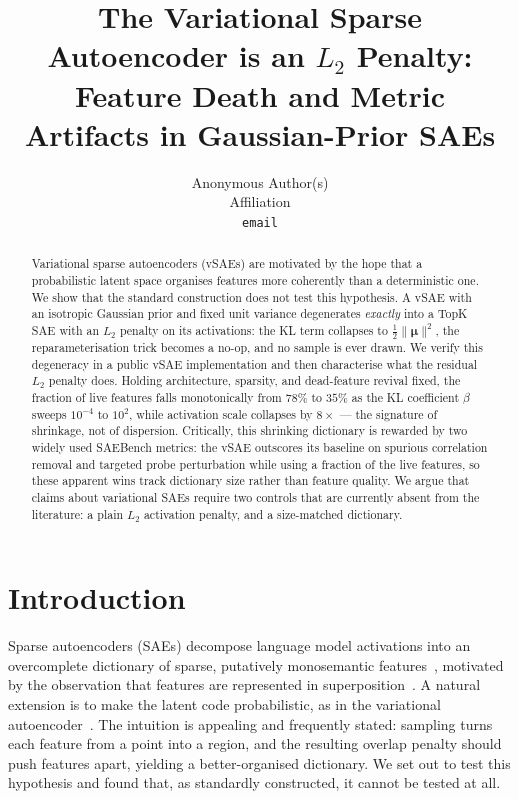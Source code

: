 \documentclass{article}
\title{The Variational Sparse Autoencoder is an $L_2$ Penalty:\\
Feature Death and Metric Artifacts in Gaussian-Prior SAEs}
\author{Anonymous Author(s)\\Affiliation\\\texttt{email}}
\begin{document}
\maketitle

\begin{abstract}
Variational sparse autoencoders (vSAEs) are motivated by the hope that a
probabilistic latent space organises features more coherently than a
deterministic one. We show that the standard construction does not test this
hypothesis. A vSAE with an isotropic Gaussian prior and fixed unit variance
degenerates \emph{exactly} into a TopK SAE with an $L_2$ penalty on its
activations: the KL term collapses to $\tfrac{1}{2}\|\boldsymbol{\mu}\|^2$, the
reparameterisation trick becomes a no-op, and no sample is ever drawn. We verify
this degeneracy in a public vSAE implementation and then characterise what the
residual $L_2$ penalty does. Holding architecture, sparsity, and dead-feature
revival fixed, the fraction of live features falls monotonically from $78\%$ to
$35\%$ as the KL coefficient $\beta$ sweeps $10^{-4}$ to $10^{2}$, while
activation scale collapses by $8\times$ --- the signature of shrinkage, not of
dispersion. Critically, this shrinking dictionary is rewarded by two widely used
SAEBench metrics: the vSAE outscores its baseline on spurious correlation removal
and targeted probe perturbation while using a fraction of the live features, so
these apparent wins track dictionary size rather than feature quality. We argue
that claims about variational SAEs require two controls that are currently absent
from the literature: a plain $L_2$ activation penalty, and a size-matched
dictionary.
\end{abstract}

\section{Introduction}

Sparse autoencoders (SAEs) decompose language model activations into an
overcomplete dictionary of sparse, putatively monosemantic
features~\citep{sharkey2022taking,cunningham2023sparse,bricken2023monosemanticity},
motivated by the observation that features are represented in
superposition~\citep{elhage2022superposition}.
A natural extension is to make the latent code probabilistic, as in the
variational autoencoder~\citep{kingma2013autoencoding}. The intuition is
appealing and frequently stated: sampling turns each feature from a point into a
region, and the resulting overlap penalty should push features apart, yielding a
better-organised dictionary. We set out to test this hypothesis and found that,
as standardly constructed, it cannot be tested at all.
\end{document}
